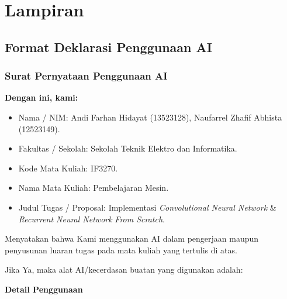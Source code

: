 
\chapter{Lampiran}

\section*{Format Deklarasi Penggunaan AI}
\subsection*{Surat Pernyataan Penggunaan AI}

\vspace{0.5cm}

\noindent\textbf{Dengan ini, kami:}
\begin{itemize}[leftmargin=*]
\item Nama / NIM: Andi Farhan Hidayat (13523128), Naufarrel Zhafif Abhista (12523149).
\item Fakultas / Sekolah: Sekolah Teknik Elektro dan Informatika.
\item Kode Mata Kuliah: IF3270.
\item Nama Mata Kuliah: Pembelajaran Mesin.
\item Judul Tugas / Proposal: Implementasi \textit{Convolutional Neural Network} \& \textit{Recurrent Neural Network} \textit{From Scratch}.
\end{itemize}

\vspace{0.5cm}

\noindent Menyatakan bahwa Kami menggunakan AI dalam pengerjaan maupun penyusunan luaran tugas pada mata kuliah yang tertulis di atas. 

\noindent Jika Ya, maka alat AI/kecerdasan buatan yang digunakan adalah:

\vspace{0.3cm}

\noindent\textbf{Detail Penggunaan}
\vspace{0.3cm}


